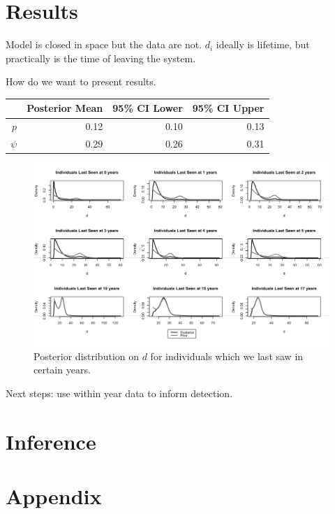 \documentclass[12pt, a4paper]{article}
\begin{document}
\section{Results}

Model is closed in space but the data are not. $d_i$ ideally is lifetime, but practically is the time of leaving the system. 

How do we want to present results. 

\begin{table}[ht]
\centering
\begin{tabular}{rrrr}
  \hline
 & Posterior Mean & 95\% CI Lower & 95\% CI Upper \\ 
  \hline
  $p$ & 0.12 & 0.10 & 0.13 \\ 
  $\psi$ & 0.29 & 0.26 & 0.31 \\ 
   \hline
\end{tabular}
\end{table}

\begin{figure}
\centering
\includegraphics[width = \textwidth]{Posterior.d.png}
\caption{Posterior distribution on $d$ for individuals which we last saw in certain years.}
\end{figure}

Next steps: use within year data to inform detection.

\section{Inference}





\section{Appendix}
\end{document}
